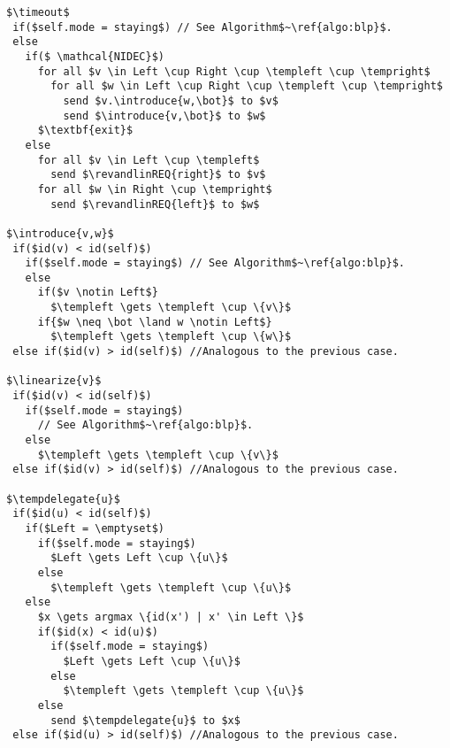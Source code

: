 \documentclass[a4paper,USenglish]{lipics}
\newcommand{\blpp}{\textsc{Build-List*}\xspace}
\newcommand{\linearize}[1]{\textsc{Linearize(\ensuremath{#1})}\xspace}
\newcommand{\introduce}[1]{\textsc{Introduce(\ensuremath{#1})}\xspace}
\newcommand{\tempdelegate}[1]{\textsc{TempDelegate(\ensuremath{#1})}\xspace}
\newcommand{\timeout}{\textsc{Timeout}\xspace}
\newcommand{\templeft}[1][]{\ensuremath{Temp_{L}\ifthenelse{\isempty{#1}}{}{(#1)}}\xspace}
\newcommand{\tempright}[1][]{\ensuremath{Temp_{R}\ifthenelse{\isempty{#1}}{}{(#1)}}\xspace}
\begin{document}
\begin{lstlisting}[mathescape=true,caption=\blpp protocol,label=algo:fdp]
$\timeout$
 if($self.mode = staying$) // See Algorithm$~\ref{algo:blp}$.
 else
   if($ \mathcal{NIDEC}$)
     for all $v \in Left \cup Right \cup \templeft \cup \tempright$ 
       for all $w \in Left \cup Right \cup \templeft \cup \tempright$
         send $v.\introduce{w,\bot}$ to $v$
         send $\introduce{v,\bot}$ to $w$
     $\textbf{exit}$
   else    
     for all $v \in Left \cup \templeft$ 
       send $\revandlinREQ{right}$ to $v$
     for all $w \in Right \cup \tempright$ 
       send $\revandlinREQ{left}$ to $w$

$\introduce{v,w}$
 if($id(v) < id(self)$)
   if($self.mode = staying$) // See Algorithm$~\ref{algo:blp}$.
   else       
     if($v \notin Left$} 
       $\templeft \gets \templeft \cup \{v\}$   
     if{$w \neq \bot \land w \notin Left$} 
       $\templeft \gets \templeft \cup \{w\}$ 
 else if($id(v) > id(self)$) //Analogous to the previous case.

$\linearize{v}$
 if($id(v) < id(self)$)
   if($self.mode = staying$) 
     // See Algorithm$~\ref{algo:blp}$.
   else 	
     $\templeft \gets \templeft \cup \{v\}$ 
 else if($id(v) > id(self)$) //Analogous to the previous case.
   
$\tempdelegate{u}$
 if($id(u) < id(self)$)
   if($Left = \emptyset$)
     if($self.mode = staying$) 
       $Left \gets Left \cup \{u\}$
     else 
       $\templeft \gets \templeft \cup \{u\}$
   else  
     $x \gets argmax \{id(x') | x' \in Left \}$
     if($id(x) < id(u)$)
       if($self.mode = staying$) 
         $Left \gets Left \cup \{u\}$
       else 
         $\templeft \gets \templeft \cup \{u\}$
     else 
       send $\tempdelegate{u}$ to $x$
 else if($id(u) > id(self)$) //Analogous to the previous case.   
\end{lstlisting}
\end{document}
